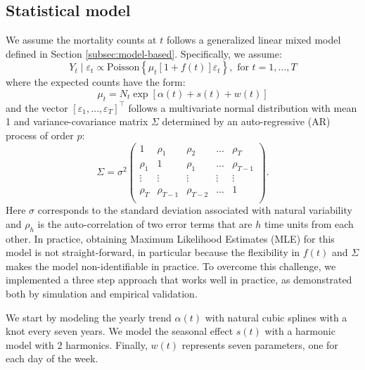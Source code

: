 \documentclass[11pt]{article}
\begin{document}
\subsection{Statistical model}
\label{subsec:statistical-model}
We assume the mortality counts at $t$ follows a generalized linear mixed model defined in Section  \ref{subsec:model-based}. Specifically, we assume:
\begin{equation*}
    Y_t \mid \varepsilon_t \propto \mbox{Poisson}\left\{ \mu_t 
    \left[1 + f(t)\right]  \varepsilon_t \right\}, \mbox{ for } t = 1, \dots,T 
\end{equation*}
where the expected counts have the form:
\begin{equation*}
    \mu_t =N_t  \exp[\alpha(t) + s(t) + w(t)]
\end{equation*}
and the vector $[\varepsilon_1, \ldots, \varepsilon_T]^\top$ follows a multivariate normal distribution with mean 1 and variance-covariance matrix $\Sigma$ determined by an auto-regressive (AR) process of order $p$:
\begin{equation*}
    \Sigma = \sigma^2
    \begin{pmatrix} 1 & \rho_1 & \rho_{2} & \dots & \rho_{T} \\ 
    \rho_{1} & 1 & \rho_{1} & \ldots & \rho_{T-1} \\
    \vdots & \vdots & \vdots & \vdots & \vdots \\
    \rho_{T} & \rho_{T-1} & \rho_{T-2} & \dots & 1 \\ 
    \end{pmatrix}.
\end{equation*}
Here $\sigma$ corresponds to the standard deviation associated with natural variability and $\rho_h$ is the auto-correlation of two error terms that are $h$ time units from each other. In practice, obtaining Maximum Likelihood Estimates (MLE) for this model is not straight-forward, in particular because the flexibility in $f(t)$ and $\Sigma$ makes the model non-identifiable in practice. To overcome this challenge, we implemented a three step approach that works well in practice, as demonstrated both by simulation and empirical validation.

We start by modeling the yearly trend $\alpha(t)$ with natural cubic splines with a knot every seven years. We model the seasonal effect $s(t)$ with a harmonic model with 2 harmonics. Finally, $w(t)$
represents seven parameters, one for each day of the week. 
\end{document}
